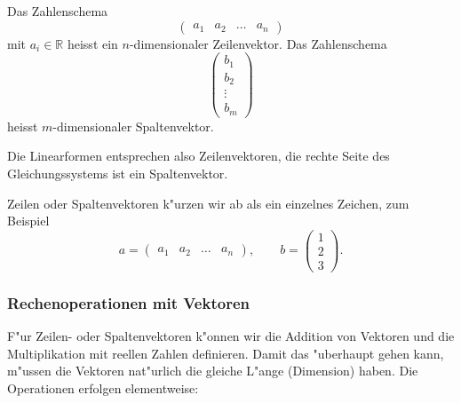 \begin{definition}
Das Zahlenschema
$$
\begin{pmatrix}
a_1&a_2&\dots&a_n
\end{pmatrix}
$$
mit $a_i\in\mathbb R$ heisst ein $n$-dimensionaler Zeilenvektor.
Das Zahlenschema
$$
\begin{pmatrix}
b_1\\b_2\\\vdots\\b_m
\end{pmatrix}
$$
heisst $m$-dimensionaler Spaltenvektor.
\end{definition}
Die Linearformen entsprechen also Zeilenvektoren, die rechte
Seite des Gleichungssystems ist ein Spaltenvektor.

Zeilen oder Spaltenvektoren k"urzen wir ab als ein einzelnes
Zeichen, zum Beispiel
$$a=\begin{pmatrix}a_1&a_2&\dots&a_n\end{pmatrix},\qquad b=\begin{pmatrix}1\\2\\3\end{pmatrix}.$$

\subsubsection{Rechenoperationen mit Vektoren}
F"ur Zeilen- oder Spaltenvektoren k"onnen wir die Addition von
Vektoren und die Multiplikation mit reellen Zahlen definieren.
Damit das "uberhaupt gehen kann, m"ussen die Vektoren nat"urlich
die gleiche L"ange (Dimension) haben.
Die Operationen erfolgen elementweise:


